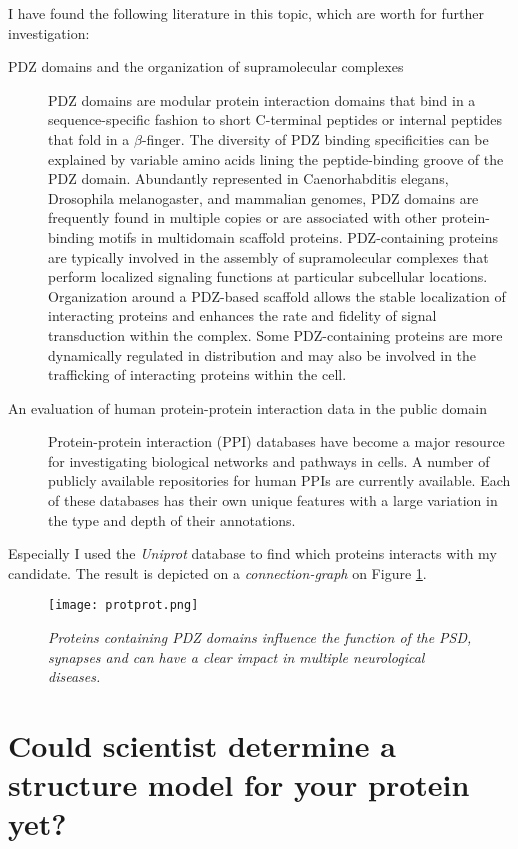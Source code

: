 I have found the following literature in this topic, which are worth for further investigation:
\begin{description}
\item[PDZ domains and the organization of supramolecular complexes~\cite{sheng2001pdz}] PDZ domains are modular protein interaction domains that bind in a sequence-specific fashion to short C-terminal peptides or internal peptides that fold in a $\beta$-finger. The diversity of PDZ binding specificities can be explained by variable amino acids lining the peptide-binding groove of the PDZ domain. Abundantly represented in Caenorhabditis elegans, Drosophila melanogaster, and mammalian genomes, PDZ domains are frequently found in multiple copies or are associated with other protein-binding motifs in multidomain scaffold proteins. PDZ-containing proteins are typically involved in the assembly of supramolecular complexes that perform localized signaling functions at particular subcellular locations. Organization around a PDZ-based scaffold allows the stable localization of interacting proteins and enhances the rate and fidelity of signal transduction within the complex. Some PDZ-containing proteins are more dynamically regulated in distribution and may also be involved in the trafficking of interacting proteins within the cell.
\item[An evaluation of human protein-protein interaction data in the public domain~\cite{mathivanan2006evaluation}] Protein-protein interaction (PPI) databases have become a major resource for investigating biological networks and pathways in cells. A number of publicly available repositories for human PPIs are currently available. Each of these databases has their own unique features with a large variation in the type and depth of their annotations.
\end{description}

Especially I used the \emph{Uniprot} database to find which proteins interacts with my candidate. The result is depicted on a \emph{connection-graph} on Figure \ref{protprot}.

\begin{figure}
\centering
\texttt{[image: protprot.png]}
\caption{\emph{Proteins containing PDZ
domains  influence the  function  of the PSD, synapses  and can  have a  clear  impact in multiple
neurological diseases.}
%
}
\label{protprot}
\end{figure}

\section{Could scientist determine a structure model for your protein yet?}

